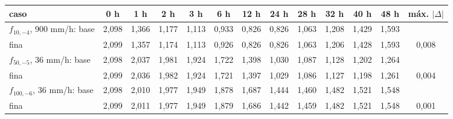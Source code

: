 \begin{tabular}{l|ccccccccccc|c}
\toprule
caso & 0 h & 1 h & 2 h & 3 h & 6 h & 12 h & 24 h & 28 h & 32 h & 40 h & 48 h & máx. $|\Delta|$\\
\midrule
$f_{10,-4}$, 900 mm/h: base & 2{,}098 & 1{,}366 & 1{,}177 & 1{,}113 & 0{,}933 & 0{,}826 & 0{,}826 & 1{,}063 & 1{,}208 & 1{,}429 & 1{,}593 & \\
\phantom{$f_{10,-4}$, 900 mm/h:} fina & 2{,}099 & 1{,}357 & 1{,}174 & 1{,}113 & 0{,}926 & 0{,}826 & 0{,}826 & 1{,}063 & 1{,}206 & 1{,}428 & 1{,}593 & 0{,}008\\
$f_{50,-5}$, 36 mm/h: base & 2{,}098 & 2{,}037 & 1{,}981 & 1{,}924 & 1{,}722 & 1{,}398 & 1{,}030 & 1{,}087 & 1{,}128 & 1{,}202 & 1{,}264 & \\
\phantom{$f_{50,-5}$, 36 mm/h:} fina & 2{,}099 & 2{,}036 & 1{,}982 & 1{,}924 & 1{,}721 & 1{,}397 & 1{,}029 & 1{,}086 & 1{,}127 & 1{,}198 & 1{,}261 & 0{,}004\\
$f_{100,-6}$, 36 mm/h: base & 2{,}098 & 2{,}010 & 1{,}977 & 1{,}949 & 1{,}878 & 1{,}687 & 1{,}444 & 1{,}460 & 1{,}482 & 1{,}521 & 1{,}548 & \\
\phantom{$f_{100,-6}$, 36 mm/h:} fina & 2{,}099 & 2{,}011 & 1{,}977 & 1{,}949 & 1{,}879 & 1{,}686 & 1{,}442 & 1{,}459 & 1{,}482 & 1{,}521 & 1{,}548 & 0{,}001\\
\bottomrule
\end{tabular}
